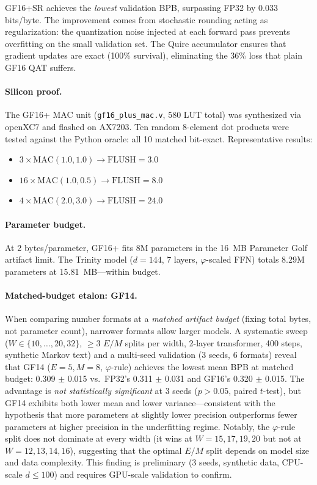 \documentclass[11pt]{article}
\begin{document}
GF16+SR achieves the \emph{lowest} validation BPB, surpassing FP32 by
0.033 bits/byte. The improvement comes from stochastic rounding acting
as regularization: the quantization noise injected at each forward pass
prevents overfitting on the small validation set. The Quire accumulator
ensures that gradient updates are exact (100\% survival), eliminating
the 36\% loss that plain GF16 QAT suffers.

\paragraph{Silicon proof.}
The GF16+ MAC unit (\texttt{gf16\_plus\_mac.v}, 580 LUT total) was
synthesized via openXC7 and flashed on AX7203. Ten random 8-element
dot products were tested against the Python oracle: all 10 matched
bit-exact. Representative results:
\begin{itemize}
\item $3 \times \text{MAC}(1.0, 1.0) \rightarrow \text{FLUSH} = 3.0$ \checkmark
\item $16 \times \text{MAC}(1.0, 0.5) \rightarrow \text{FLUSH} = 8.0$ \checkmark
\item $4 \times \text{MAC}(2.0, 3.0) \rightarrow \text{FLUSH} = 24.0$ \checkmark
\end{itemize}

\paragraph{Parameter budget.}
At 2 bytes/parameter, GF16+ fits 8M parameters in the 16~MB Parameter
Golf artifact limit. The Trinity model ($d{=}144$, 7 layers, $\varphi$-scaled
FFN) totals 8.29M parameters at 15.81~MB---within budget.

\paragraph{Matched-budget etalon: GF14.}
When comparing number formats at a \emph{matched artifact budget} (fixing total
bytes, not parameter count), narrower formats allow larger models. A systematic
sweep ($W \in \{10,\ldots,20,32\}$, $\geq 3$ $E/M$ splits per width, 2-layer
transformer, 400 steps, synthetic Markov text) and a multi-seed validation
(3 seeds, 6 formats) reveal that GF14 ($E{=}5, M{=}8$, $\varphi$-rule)
achieves the lowest mean BPB at matched budget: 0.309 $\pm$ 0.015 vs.\ FP32's
0.311 $\pm$ 0.031 and GF16's 0.320 $\pm$ 0.015. The advantage is
\emph{not statistically significant} at 3 seeds ($p > 0.05$, paired $t$-test),
but GF14 exhibits both lower mean and lower variance---consistent with the
hypothesis that more parameters at slightly lower precision outperforms fewer
parameters at higher precision in the underfitting regime. Notably, the
$\varphi$-rule split does not dominate at every width (it wins at $W{=}15,17,19,20$
but not at $W{=}12,13,14,16$), suggesting that the optimal $E/M$ split depends
on model size and data complexity. This finding is preliminary (3 seeds,
synthetic data, CPU-scale $d \leq 100$) and requires GPU-scale validation
to confirm.
\end{document}
